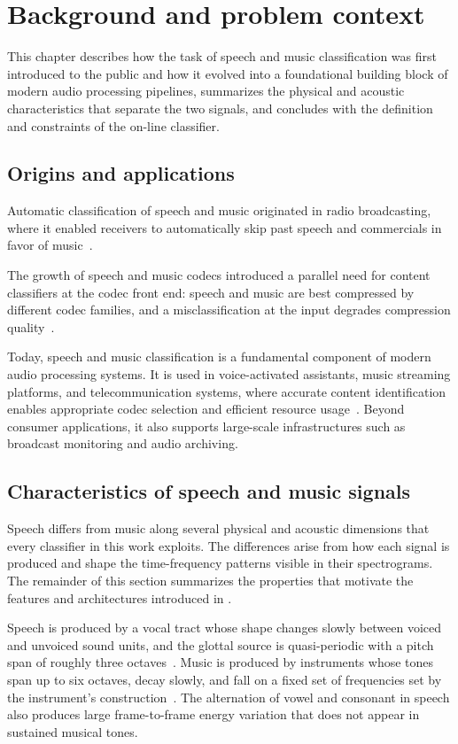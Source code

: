 \chapter{Background and problem context}
\label{cap:background}
This chapter describes how the task of speech and music classification was first introduced to the public and how it evolved into a foundational building block of modern audio processing pipelines, summarizes the physical and acoustic characteristics that separate the two signals, and concludes with the definition and constraints of the on-line classifier.

\section{Origins and applications}
Automatic classification of speech and music originated in radio broadcasting, where it enabled receivers to automatically skip past speech and commercials in favor of music~\cite{saunders1996realtime}.

The growth of speech and music codecs introduced a parallel need for content classifiers at the codec front end: speech and music are best compressed by different codec families, and a misclassification at the input degrades compression quality~\cite{scheirer1997discriminator}.

Today, speech and music classification is a fundamental component of modern audio processing systems.
It is used in voice-activated assistants, music streaming platforms, and telecommunication systems, where accurate content identification enables appropriate codec selection and efficient resource usage~\cite{neuendorf2013usac}.
Beyond consumer applications, it also supports large-scale infrastructures such as broadcast monitoring and audio archiving.

\section{Characteristics of speech and music signals}
\label{sec:characteristics}
Speech differs from music along several physical and acoustic dimensions that every classifier in this work exploits.
The differences arise from how each signal is produced and shape the time-frequency patterns visible in their spectrograms.
The remainder of this section summarizes the properties that motivate the features and architectures introduced in .

Speech is produced by a vocal tract whose shape changes slowly between voiced and unvoiced sound units, and the glottal source is quasi-periodic with a pitch span of roughly three octaves~\cite{khonglah2016gmmsvm}.
Music is produced by instruments whose tones span up to six octaves, decay slowly, and fall on a fixed set of frequencies set by the instrument's construction~\cite{bhattacharjee2018sps}.
The alternation of vowel and consonant in speech also produces large frame-to-frame energy variation that does not appear in sustained musical tones.


